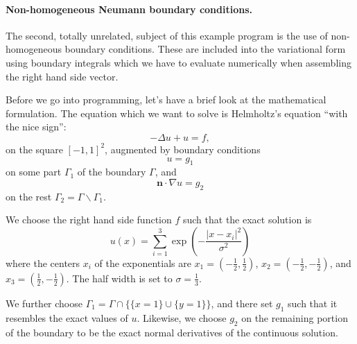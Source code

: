 \documentclass{article}
\begin{document}
\paragraph{Non-homogeneous Neumann boundary conditions.} The second, totally
unrelated, subject of this example program is the use of non-homogeneous
boundary conditions. These are included into the variational form using
boundary integrals which we have to evaluate numerically when assembling the
right hand side vector.

Before we go into programming, let's have a brief look at the mathematical
formulation. The equation which we want to solve is Helmholtz's equation
``with the nice sign'':
$$
  -\Delta u + u = f,
$$
on the square $[-1,1]^2$, augmented by boundary conditions
$$
  u = g_1
$$
on some part $\Gamma_1$ of the boundary $\Gamma$, and
$$
  {\mathbf n}\cdot \nabla u = g_2
$$
on the rest $\Gamma_2 = \Gamma \backslash \Gamma_1$.

We choose the right hand side function $f$ such that the exact solution is
$$
  u(x) = \sum_{i=1}^3 \exp\left(-\frac{|x-x_i|^2}{\sigma^2}\right)
$$
where the centers $x_i$ of the exponentials are 
  $x_1=(-\frac 12,\frac 12)$,
  $x_2=(-\frac 12,-\frac 12)$, and
  $x_3=(\frac 12,-\frac 12)$.
The half width is set to $\sigma=\frac 13$.

We further choose $\Gamma_1=\Gamma \cap\{\{x=1\} \cup \{y=1\}\}$, and there
set $g_1$ such that it resembles the exact values of $u$. Likewise, we choose
$g_2$ on the remaining portion of the boundary to be the exact normal
derivatives of the continuous solution.
\end{document}
